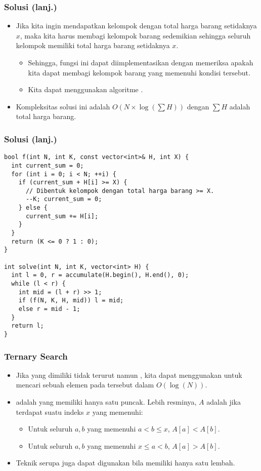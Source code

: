 \begin{frame}
\frametitle{Solusi (lanj.)}
\begin{itemize}
  \item Jika kita ingin mendapatkan kelompok dengan total harga barang setidaknya $x$, maka kita harus membagi kelompok barang sedemikian sehingga seluruh kelompok memiliki total harga barang setidaknya $x$.
  \begin{itemize}
    \item Sehingga, fungsi ini dapat diimplementasikan dengan memeriksa apakah kita dapat membagi kelompok barang yang memenuhi kondisi tersebut.
    \item Kita dapat menggunakan algoritme \fgreedy.
  \end{itemize}
  \item Kompleksitas solusi ini adalah $O(N \times \log(\sum H))$ dengan $\sum H$ adalah total harga barang.
\end{itemize}
\end{frame}

\begin{frame}[fragile]
\frametitle{Solusi (lanj.)}
\begin{lstlisting}
bool f(int N, int K, const vector<int>& H, int X) {
  int current_sum = 0;
  for (int i = 0; i < N; ++i) {
    if (current_sum + H[i] >= X) {
      // Dibentuk kelompok dengan total harga barang >= X.
      --K; current_sum = 0;
    } else {
      current_sum += H[i];
    }
  }
  return (K <= 0 ? 1 : 0);
}

int solve(int N, int K, vector<int> H) {
  int l = 0, r = accumulate(H.begin(), H.end(), 0);
  while (l < r) {
    int mid = (l + r) >> 1;
    if (f(N, K, H, mid)) l = mid;
    else r = mid - 1;
  }
  return l;
}
\end{lstlisting}
\end{frame}

\begin{frame}
\frametitle{Ternary Search}
\begin{itemize}
  \item Jika \farray yang dimiliki tidak terurut namun \funimodal, kita dapat menggunakan \fternarySearch untuk mencari sebuah elemen pada \farray tersebut dalam $O(\log(N))$.
  \item \fArray {} adalah \farray yang memiliki hanya satu puncak. Lebih resminya, \fArray $A$ adalah \funimodal jika terdapat suatu indeks $x$ yang memenuhi:
  \begin{itemize}
    \item Untuk seluruh $a, b$ yang memenuhi $a < b \le x$, $A[a] < A[b]$.
    \item Untuk seluruh $a, b$ yang memenuhi $x \le a < b$, $A[a] > A[b]$.
  \end{itemize}
  \item Teknik serupa juga dapat digunakan bila \farray memiliki hanya satu lembah.
\end{itemize}
\end{frame}

